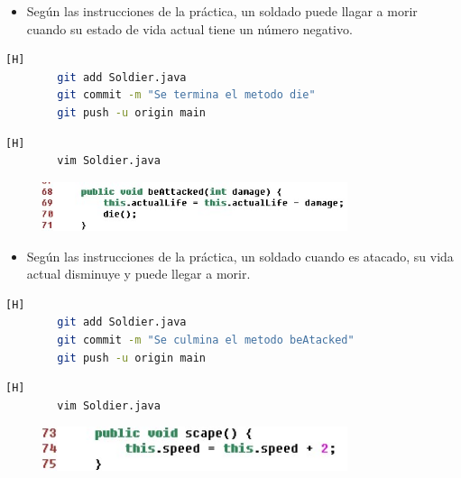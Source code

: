 \documentclass{article}
\begin{document}
	\begin{itemize}	
		\item Según las instrucciones de la práctica, un soldado puede llagar a morir cuando su estado de vida actual tiene un número negativo.
	\end{itemize}
	
	\begin{lstlisting}[language=bash,caption={Commit: 878a442ed1b50d5bf9c8da86d2f096c1128784fd }][H]
		git add Soldier.java
		git commit -m "Se termina el metodo die"			
		git push -u origin main
	\end{lstlisting}	
	
	
	\begin{lstlisting}[language=bash,caption={Se crea el metodo ser atacado}][H]
		vim Soldier.java
	\end{lstlisting}
	
	\begin{figure}[H]
		\centering
		\includegraphics[width=0.8\textwidth,keepaspectratio]{img/beAttacked.jpg}
	\end{figure}
	
	\begin{itemize}	
		\item Según las instrucciones de la práctica, un soldado cuando es atacado, su vida actual disminuye y puede llegar a morir.
	\end{itemize}
	
	\begin{lstlisting}[language=bash,caption={Commit: 592d758a6eabb49b6bc92d420a6c112081203c4d }][H]
		git add Soldier.java
		git commit -m "Se culmina el metodo beAtacked"			
		git push -u origin main
	\end{lstlisting}
	
	
	\begin{lstlisting}[language=bash,caption={Se crea el metodo huir}][H]
		vim Soldier.java
	\end{lstlisting}
	
	\begin{figure}[H]
		\centering
		\includegraphics[width=0.8\textwidth,keepaspectratio]{img/scape.jpg}
	\end{figure}
	
\end{document}
